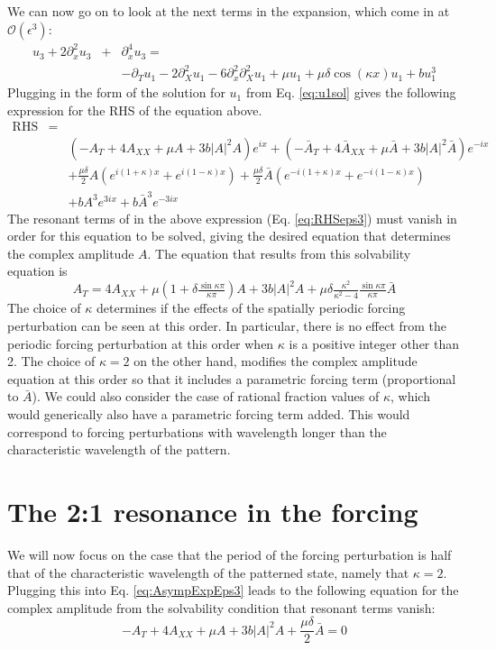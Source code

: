 \documentclass[api,pof,pre,12pt,a4paper]{revtex4-1}
\begin{document}
We can now go on to look at the next terms in the expansion, which come in at $\mathcal{O}(\epsilon^3)$:
\begin{eqnarray}
u_3+2\partial_x^2 u_3 &+& \partial_x^4 u_3 =  \nonumber \\
& & -\partial_T u_1-2\partial_X^2 u_1 - 6\partial_x^2 \partial_X^2 u_1 +\mu u_1 +\mu \delta \cos(\kappa x)  u_1 +b u_1^3
\label{eq:AsympExpEps3}
\end{eqnarray}
Plugging in the form of the solution for $u_1$ from Eq. \ref{eq:u1sol} gives the following expression for the RHS of the equation above.
\begin{eqnarray}
\text{RHS}&=&  \nonumber \\ 
& &\left(-A_T  +4 A_{XX}+\mu A + 3b |A|^2 A\right)e^{ix} + \left(-\bar{A}_T +4 \bar{A}_{XX}+\mu \bar{A} + 3b |A|^2 \bar{A}\right)e^{-ix} \nonumber \\
& &+\frac{\mu\delta}{2} A\left(e^{i(1+\kappa)x}+e^{i(1-\kappa)x} \right) + \frac{\mu\delta}{2} \bar{A}\left( e^{-i(1+\kappa)x}+e^{-i(1-\kappa)x} \right) \nonumber \\
& & +bA^3e^{3ix}+b\bar{A}^3e^{-3ix}
\label{eq:RHSeps3}
\end{eqnarray}
The resonant terms of in the above expression (Eq. \ref{eq:RHSeps3}) must vanish in order for this equation to be solved, giving the desired equation that determines the complex amplitude $A$.  The equation that results from this solvability equation is
\begin{equation}
A_T= 4 A_{XX}+\mu\left(1+\delta \tfrac{\sin\kappa \pi}{\kappa\pi}\right) A + 3b |A|^2 A+\mu\delta\tfrac{\kappa^2}{\kappa^2-4}\tfrac{\sin\kappa\pi}{\kappa\pi}\bar{A}
\label{eq:Aeq}
\end{equation}
The choice of $\kappa$ determines if the effects of the spatially periodic forcing perturbation can be seen at this order.  In particular, there is no effect from the periodic forcing perturbation at this order when $\kappa$ is a positive integer other than 2.  The choice of $\kappa=2$ on the other hand, modifies the complex amplitude equation at this order so that it includes a parametric forcing term (proportional to $\bar{A}$).  We could also consider the case of rational fraction values of $\kappa$, which would generically also have a parametric forcing term added.  This would correspond to forcing perturbations with wavelength longer than the characteristic wavelength of the pattern.   

\section{The 2:1 resonance in the forcing}
We will now focus on the case that the period of the forcing perturbation is half that of the characteristic wavelength of the patterned state, namely that $\kappa=2$.  Plugging this into Eq. \ref{eq:AsympExpEps3} leads to the following equation for the complex amplitude from the solvability condition that resonant terms vanish:
\begin{equation}
-A_T  +4 A_{XX}+\mu A + 3b |A|^2 A+\frac{\mu\delta}{2}\bar{A}=0
\label{eq:LGEpf1}
\end{equation}
\end{document}

